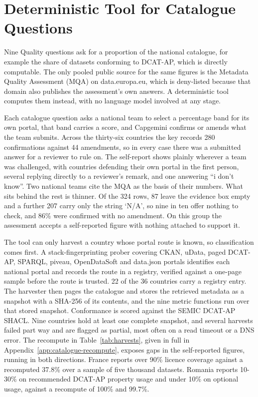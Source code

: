 \section{Deterministic Tool for Catalogue Questions}\label{sec:catalogue-tool}

Nine Quality questions ask for a proportion of the national catalogue, for example the share of datasets conforming to DCAT-AP, which is directly computable. The only pooled public source for the same figures is the Metadata Quality Assessment (MQA) on data.europa.eu, which is deny-listed because that domain also publishes the assessment's own answers. A deterministic tool computes them instead, with no language model involved at any stage.

Each catalogue question asks a national team to select a percentage band for its own portal, that band carries a score, and Capgemini confirms or amends what the team submits. Across the thirty-six countries the key records 280 confirmations against 44 amendments, so in every case there was a submitted answer for a reviewer to rule on. The self-report shows plainly wherever a team was challenged, with countries defending their own portal in the first person, several replying directly to a reviewer's remark, and one answering ``i don't know''. Two national teams cite the MQA as the basis of their numbers. What sits behind the rest is thinner. Of the 324 rows, 87 leave the evidence box empty and a further 207 carry only the string `N/A', so nine in ten offer nothing to check, and 86\% were confirmed with no amendment. On this group the assessment accepts a self-reported figure with nothing attached to support it.

The tool can only harvest a country whose portal route is known, so classification comes first. A stack-fingerprinting prober covering CKAN, uData, paged DCAT-AP, SPARQL, piveau, OpenDataSoft and data.json portals identifies each national portal and records the route in a registry, verified against a one-page sample before the route is trusted. 22 of the 36 countries carry a registry entry. The harvester then pages the catalogue and stores the retrieved metadata as a snapshot with a SHA-256 of its contents, and the nine metric functions run over that stored snapshot. Conformance is scored against the SEMIC DCAT-AP SHACL. Nine countries hold at least one complete snapshot, and several harvests failed part way and are flagged as partial, most often on a read timeout or a DNS error. The recompute in Table~\ref{tab:harvests}, given in full in Appendix~\ref{app:catalogue-recompute}, exposes gaps in the self-reported figures, running in both directions. France reports over 90\% licence coverage against a recomputed 37.8\% over a sample of five thousand datasets. Romania reports 10-30\% on recommended DCAT-AP property usage and under 10\% on optional usage, against a recompute of 100\% and 99.7\%.


